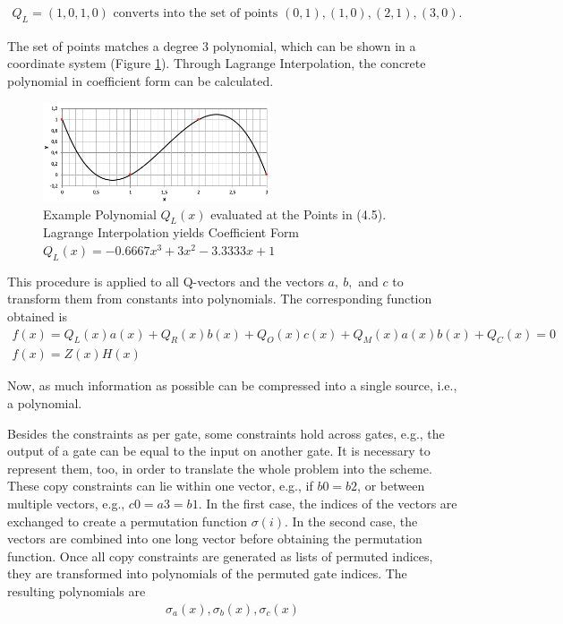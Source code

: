 \begin{align}
    Q_L = (1,0,1,0) \text{ converts into the set of points } {(0,1), (1,0), (2,1), (3,0)}.
\end{align}

The set of points matches a degree 3 polynomial, which can be shown in a coordinate system (Figure \ref{fig:examplepoly}). Through Lagrange Interpolation, the concrete polynomial in coefficient form can be calculated. 
\begin{figure}[hbt]
	\centering
	\includegraphics[width=0.6\textwidth]{Pictures/example_polynomial.png}
	\caption{Example Polynomial \(Q_{L}(x)\) evaluated at the Points in (4.5). Lagrange Interpolation yields Coefficient Form \(Q_{L}(x) = - 0.6667x^3 + 3x^2 - 3.3333x + 1\)}
	\label{fig:examplepoly}
\end{figure}

This procedure is applied to all Q-vectors and the vectors \(a,\ b,\) and \(c\) to transform them from constants into polynomials. The corresponding function obtained is
\begin{align}
    f(x) = Q_{L}(x)a(x) + Q_{R}(x)b(x) + Q_{O}(x)c(x) + Q_{M}(x)a(x)b(x) + Q_{C}(x) = 0\\
    f(x) = Z(x)H(x)
\end{align}

Now, as much information as possible can be compressed into a single source, i.e., a polynomial. 

Besides the constraints as per gate, some constraints hold across gates, e.g., the output of a gate can be equal to the input on another gate. It is necessary to represent them, too, in order to translate the whole problem into the scheme. These copy constraints can lie within one vector, e.g., if \(b0 = b2\), or between multiple vectors, e.g., \(c0 = a3 = b1\). In the first case, the indices of the vectors are exchanged to create a permutation function \(\sigma(i)\). In the second case, the vectors are combined into one long vector before obtaining the permutation function. Once all copy constraints are generated as lists of permuted indices, they are transformed into polynomials of the permuted gate indices. The resulting polynomials are
\begin{align}
    \sigma_{a}(x), \sigma_{b}(x), \sigma_{c}(x)
\end{align}

